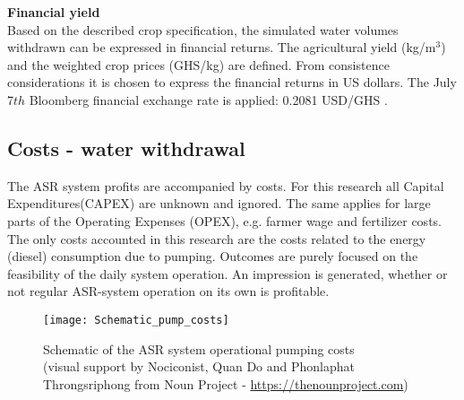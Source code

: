 %
%
%
%

\textbf{Financial yield} \\
Based on the described crop specification, the simulated water volumes withdrawn can be expressed in financial returns. The agricultural yield (kg/m$^3$) and the weighted crop prices (GHS/kg) are defined. From consistence considerations it is chosen to express the financial returns in US dollars. The July 7$th$ Bloomberg financial exchange rate is applied: 0.2081 USD/GHS \citep{Bloomberg2018}.

\subsection{Costs - water withdrawal}
The ASR system profits are accompanied by costs. For this research all Capital Expenditures(CAPEX) are unknown and ignored. The same applies for large parts of the Operating Expenses (OPEX), e.g. farmer wage and fertilizer costs. The only costs accounted in this research are the costs related to the energy (diesel) consumption due to pumping. Outcomes are purely focused on the feasibility of the daily system operation. An impression is generated, whether or not regular ASR-system operation on its own is profitable. \\

\begin{figure}[h!]
 \centering
 \texttt{[image: Schematic\_pump\_costs]}
 \captionsetup{justification=centering} 
 \caption[Schematic of the ASR system operational pumping costs]{Schematic of the ASR system operational pumping costs \\ (visual support by Nociconist, Quan Do and Phonlaphat Throngsriphong from Noun Project - \url{https://thenounproject.com})}
 \label{fig:Schematic_pump_costs}
\end{figure}


